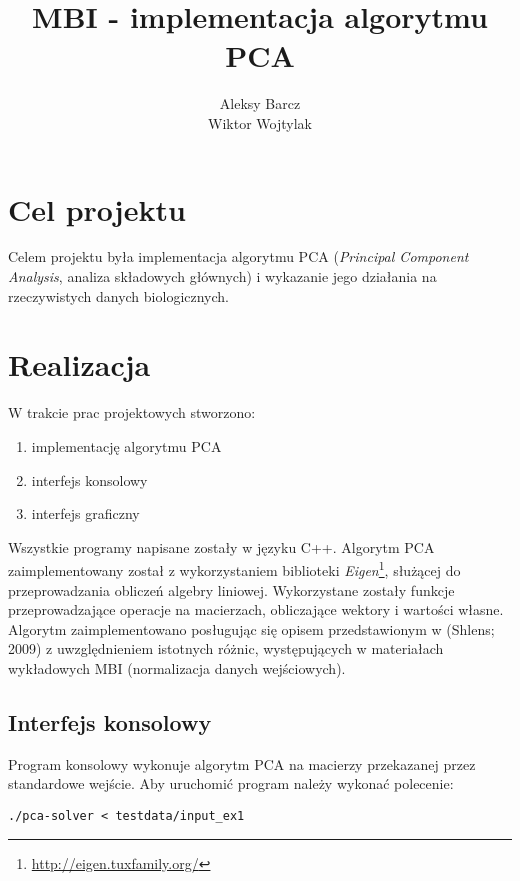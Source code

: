 \documentclass{article}
\begin{document}
\title{MBI - implementacja algorytmu PCA}
\author{Aleksy Barcz \\ Wiktor Wojtylak}

\maketitle

\section{Cel projektu}

Celem projektu była implementacja algorytmu PCA (\emph{Principal Component Analysis}, analiza składowych głównych) i wykazanie jego działania na rzeczywistych danych biologicznych.

\section{Realizacja}

W trakcie prac projektowych stworzono:

\begin{enumerate}

\item{implementację algorytmu PCA}
\item{interfejs konsolowy}
\item{interfejs graficzny}

\end{enumerate}

Wszystkie programy napisane zostały w języku C++. Algorytm PCA zaimplementowany został z wykorzystaniem biblioteki \emph{Eigen}\footnote{\url{http://eigen.tuxfamily.org/}}, służącej do przeprowadzania obliczeń algebry liniowej. Wykorzystane zostały funkcje przeprowadzające operacje na macierzach, obliczające wektory i wartości własne. Algorytm zaimplementowano posługując się opisem przedstawionym w (Shlens; 2009) z uwzględnieniem istotnych różnic, 
występujących w materiałach wykładowych MBI (normalizacja danych wejściowych). 

\subsection{Interfejs konsolowy}

Program konsolowy wykonuje algorytm PCA na macierzy przekazanej przez standardowe wejście. Aby uruchomić program należy wykonać polecenie:

\begin{verbatim}
./pca-solver < testdata/input_ex1
\end{verbatim}
\end{document}
